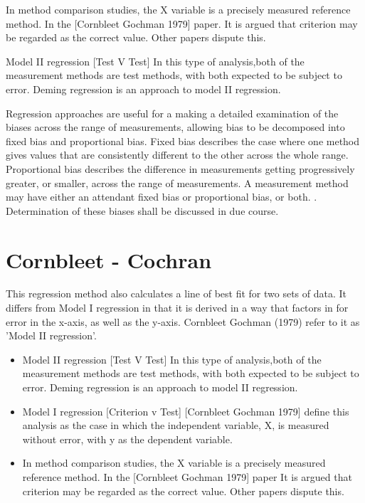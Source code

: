\documentclass[12pt, a4paper]{report}
\theoremstyle{plain}
\theoremstyle{definition}
\theoremstyle{remark}
\begin{document}
In method comparison studies, the X variable is a precisely measured reference method. In the [Cornbleet Gochman 1979] paper. It is argued that criterion may be regarded as the correct value. Other papers dispute this.


Model II regression [Test V Test]
In this type of analysis,both of the measurement methods are test methods, with both expected to be subject to error. Deming regression is an approach to model II regression.



Regression approaches are useful for a making a detailed examination of the biases across the range of measurements, allowing bias to be decomposed into fixed bias and proportional bias. Fixed bias describes the case where one method gives values that are consistently different to the other across the whole range. Proportional
bias describes the difference in measurements getting progressively greater, or smaller, across the range of measurements. A measurement method may have either an attendant fixed bias or proportional bias, or both. \citep{ludbrook}. Determination of these biases shall be discussed in due course.


\section{Cornbleet - Cochran }
This regression method also calculates a line of best fit for two sets of data. It differs from Model I regression in that it is derived in a way that factors in for error in the x-axis, as well as the y-axis. Cornbleet Gochman (1979) refer to it as 'Model II regression'.

\begin{itemize}
\item Model II regression [Test V Test] In this type of analysis,both of the measurement methods are test methods, with both expected to be subject to error. Deming regression is an approach to model II regression.

\item Model I regression [Criterion v Test] [Cornbleet Gochman 1979] define this analysis as the case in which the independent variable, X, is measured without error, with y as the dependent
variable.

\item In method comparison studies, the X variable is a precisely measured reference method. In the [Cornbleet Gochman 1979] paper It is argued that criterion may be regarded as the correct value.
Other papers dispute this.
\end{itemize}
\end{document}
